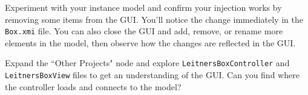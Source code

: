 \begin{stepbystep}
\item Experiment with your instance model and confirm your injection works by removing some items from the GUI.  You'll notice the change
immediately in the \texttt{Box.xmi} file. You can also close the GUI and add, remove, or rename more elements in the model, then observe how the changes are
reflected in the GUI.

\vspace{0.5cm}

\item Expand the ``Other Projects" node and explore \texttt{LeitnersBoxController} and \texttt{LeitnersBoxView} files to get an
understanding of the GUI. Can you find where the controller loads and connects to the model?

\end{stepbystep}
